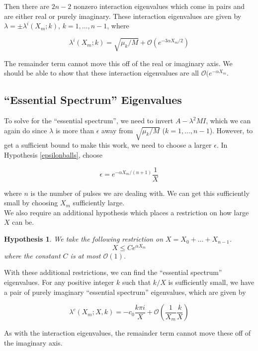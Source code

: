 \documentclass[12pt]{article}
\newtheorem{hypothesis}{Hypothesis}
\begin{document}
Then there are $2n-2$ nonzero interaction eigenvalues which come in pairs and are either real or purely imaginary. These interaction eigenvalues are given by $\lambda = \pm \lambda^i(X_m; k)$, $k = 1, \dots, n-1$, where

\begin{equation}\label{inteigs}
\lambda^i(X_m; k) = \sqrt{\mu_k / M} + \mathcal{O}(e^{-3 \alpha X_m/2})
\end{equation}

The remainder term cannot move this off of the real or imaginary axis. We should be able to show that these interaction eigenvalues are all $\mathcal{O}(e^{-\alpha X_m}$.

\subsection{``Essential Spectrum'' Eigenvalues}

To solve for the ``essential spectrum'', we need to invert $A - \lambda^2 M I$, which we can again do since $\lambda$ is more than $\epsilon$ away from $\sqrt{\mu_k/M}$ ($k = 1, \dots, n-1$). However, to get a sufficient bound to make this work, we need to choose a larger $\epsilon$. In Hypothesis \ref{epsilonballs}, choose

\[
\epsilon = e^{-\alpha X_m/(n+1)} \frac{1}{X}
\]

where $n$ is the number of pulses we are dealing with. We can get this sufficiently small by choosing $X_m$ sufficiently large.\\ 

We also require an additional hypothesis which places a restriction on how large $X$ can be.

\begin{hypothesis}\label{Xrestriction}
We take the following restriction on $X = X_0 + \dots + X_{n-1}$.
\[
X \leq C e^{\alpha X_m}
\]
where the constant $C$ is at most $\mathcal{O}(1)$.
\end{hypothesis}

With these additional restrictions, we can find the ``essential spectrum'' eigenvalues. For any positive integer $k$ such that $k/X$ is sufficiently small, we have a pair of purely imaginary ``essential spectrum'' eigenvalues, which are given by

\[
\lambda^c(X_m; X, k) = -c_0 \frac{k \pi i}{X} + \mathcal{O}\left( \frac{1}{X_m} \frac{k}{X} \right)
\]

As with the interaction eigenvalues, the remainder term cannot move these off of the imaginary axis.\\
\end{document}
